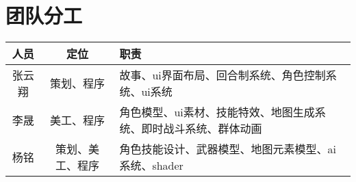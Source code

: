 ﻿\documentclass{article}
\begin{document}
\section{团队分工}
\begin{table}[htbp]
	\centering
	\begin{tabular}{|c|c|p{8cm}|}
		\hline
		人员 & 定位 & 职责 \\
		\hline
		张云翔 & 策划、程序 & 故事、ui界面布局、回合制系统、角色控制系统、ui系统 \\
		\hline
		李晟 & 美工、程序 & 角色模型、ui素材、技能特效、地图生成系统、即时战斗系统、群体动画 \\
		\hline
		杨铭 & 策划、美工、程序 & 角色技能设计、武器模型、地图元素模型、ai系统、shader \\
		\hline
	\end{tabular}
\end{table}
\end{document}
